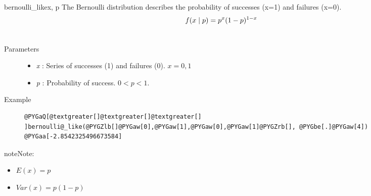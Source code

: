 \hypertarget{pymc.distributions.bernoulli_like}{}\begin{funcdesc}{bernoulli\_like}{x, p}
The Bernoulli distribution describes the probability of successes (x=1) and
failures (x=0).
\begin{gather}
\begin{split}f(x \mid p) = p^{x} (1-p)^{1-x}\end{split}\notag\\\begin{split}\end{split}\notag
\end{gather}\begin{description}
\item[Parameters] \leavevmode\begin{itemize}
\item {} 
\emph{x} : Series of successes (1) and failures (0). $x=0,1$

\item {} 
\emph{p} : Probability of success. $0 < p < 1$.

\end{itemize}

\item[Example] \leavevmode
\begin{Verbatim}[commandchars=@\[\]]
@PYGaQ[@textgreater[]@textgreater[]@textgreater[] ]bernoulli@_like(@PYGZlb[]@PYGaw[0],@PYGaw[1],@PYGaw[0],@PYGaw[1]@PYGZrb[], @PYGbe[.]@PYGaw[4])
@PYGaa[-2.8542325496673584]
\end{Verbatim}

\end{description}

\begin{notice}{note}{Note:}\begin{itemize}
\item {} 
$E(x)= p$

\item {} 
$Var(x)= p(1-p)$

\end{itemize}
\end{notice}
\end{funcdesc}

